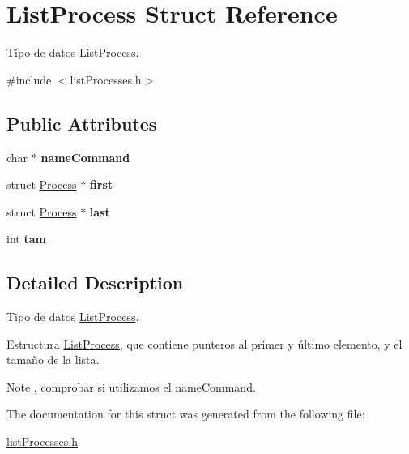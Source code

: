 \hypertarget{structListProcess}{\section{List\-Process Struct Reference}
\label{structListProcess}
}


Tipo de datos \hyperlink{structListProcess}{List\-Process}.  




{\ttfamily \#include $<$list\-Processes.\-h$>$}

\subsection*{Public Attributes}
\begin{DoxyCompactItemize}
\item 
\hypertarget{structListProcess_a77a5b3dda58f645dec72bfb091a51ebd}{char $\ast$ {\bfseries name\-Command}}\label{structListProcess_a77a5b3dda58f645dec72bfb091a51ebd}

\item 
\hypertarget{structListProcess_a563c4a3c4153b0bc75553e37f764a3ae}{struct \hyperlink{structProcess}{Process} $\ast$ {\bfseries first}}\label{structListProcess_a563c4a3c4153b0bc75553e37f764a3ae}

\item 
\hypertarget{structListProcess_a19069a49cd552b87631ed1831cf50f2b}{struct \hyperlink{structProcess}{Process} $\ast$ {\bfseries last}}\label{structListProcess_a19069a49cd552b87631ed1831cf50f2b}

\item 
\hypertarget{structListProcess_a686211ecb4f1a8bbad696a792b1b6e4c}{int {\bfseries tam}}\label{structListProcess_a686211ecb4f1a8bbad696a792b1b6e4c}

\end{DoxyCompactItemize}


\subsection{Detailed Description}
Tipo de datos \hyperlink{structListProcess}{List\-Process}. 

Estructura \hyperlink{structListProcess}{List\-Process}, que contiene punteros al primer y último elemento, y el tamaño de la lista. \begin{DoxyNote}{Note}
, comprobar si utilizamos el name\-Command. 
\end{DoxyNote}


The documentation for this struct was generated from the following file\-:\begin{DoxyCompactItemize}
\item 
\hyperlink{listProcesses_8h}{list\-Processes.\-h}\end{DoxyCompactItemize}
